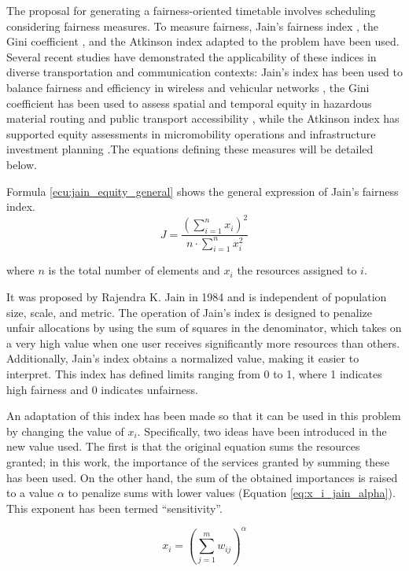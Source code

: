 \documentclass[preprint,12pt]{elsarticle}
\begin{document}
The proposal for generating a fairness-oriented timetable involves scheduling considering fairness measures. To measure fairness, Jain's fairness index \cite{Jain1998}, the Gini coefficient \cite{Gini1912}, and the Atkinson index \cite{Atkinson1970} adapted to the problem have been used. Several recent studies have demonstrated the applicability of these indices in diverse transportation and communication contexts: Jain's index has been used to balance fairness and efficiency in wireless and vehicular networks \cite{Elnaby2021, Avcil2024}, the Gini coefficient has been used to assess spatial and temporal equity in hazardous material routing and public transport accessibility \cite{Romero2016, Raza2023}, while the Atkinson index has supported equity assessments in micromobility operations and infrastructure investment planning \cite{Lina2024, Chen2025}.The equations defining these measures will be detailed below.

Formula \ref{ecu:jain_equity_general} shows the general expression of Jain's fairness index. 
\begin{equation}\label{ecu:jain_equity_general}
    J = \frac{\left( \sum_{i=1}^{n} x_i \right)^2}{n \cdot \sum_{i=1}^{n} x_i^2}
\end{equation}

where $n$ is the total number of elements and $x_i$ the resources assigned to $i$.

It was proposed by Rajendra K. Jain in 1984 and is independent of population size, scale, and metric. The operation of Jain's index is designed to penalize unfair allocations by using the sum of squares in the denominator, which takes on a very high value when one user receives significantly more resources than others. Additionally, Jain's index obtains a normalized value, making it easier to interpret. This index has defined limits ranging from 0 to 1, where 1 indicates high fairness and 0 indicates unfairness.

An adaptation of this index has been made so that it can be used in this problem by changing the value of $x_i$. Specifically, two ideas have been introduced in the new value used. The first is that the original equation sums the resources granted; in this work, the importance of the services granted by summing these has been used. On the other hand, the sum of the obtained importances is raised to a value $\alpha$ to penalize sums with lower values (Equation \ref{eq:x_i_jain_alpha}). This exponent has been termed ``sensitivity''.

\begin{equation}
x_i = \left(\sum_{j=1}^{m} w_{ij}\right)^\alpha
\label{eq:x_i_jain_alpha}
\end{equation}
\end{document}
